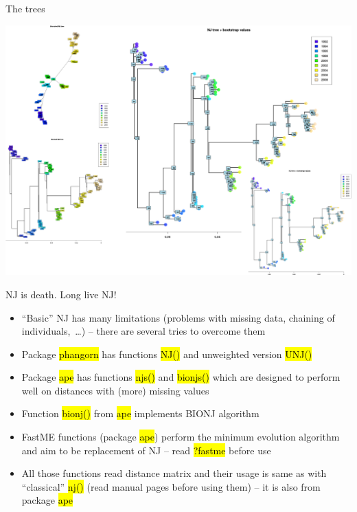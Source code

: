 \documentclass[compress, ucs, xelatex, 11pt, xcolor=svgnames,
  hyperref={
    bookmarks=true,
    unicode=true,
    colorlinks=true,
    pdftitle={Molecular data in R},
    plainpages=false,
    pdfauthor={Vojtech Zeisek},
    pdfsubject={Course about phylogeny and evolution in R},
    pdfcreator={XeLaTeX},
    pdfkeywords={R, evolution, phylogeny, molecular data},
    linkcolor=Tomato,
    anchorcolor=SaddleBrown,
    citecolor=Goldenrod,
    filecolor=DarkMagenta,
    menucolor=Sienna,
    urlcolor=DarkTurquoise,
    pdftex},
  url={hyphens, lowtilde} %
  ]{beamer}
\renewcommand{\texttt}[1]{\hl{\ttfamily #1}}
\begin{document}
\begin{frame}{The trees}
  \begin{center}
    \includegraphics[width=\textwidth-2.5cm]{nj_dna.png}
  \end{center}
\end{frame}

\begin{frame}{NJ is death. Long live NJ!}
  \label{NJ-replacement}
  \begin{itemize}
  \item ``Basic'' NJ has many limitations (problems with missing data, chaining of individuals,~\ldots) -- there are several tries to overcome them
  \item Package \texttt{phangorn} has functions \texttt{NJ()} and unweighted version \texttt{UNJ()}
  \item Package \texttt{ape} has functions \texttt{njs()} and \texttt{bionjs()} which are designed to perform well on distances with (more) missing values
  \item Function \texttt{bionj()} from \texttt{ape} implements BIONJ algorithm
  \item FastME functions (package \texttt{ape}) perform the minimum evolution algorithm and aim to be replacement of NJ -- read \texttt{?fastme} before use
  \item All those functions read distance matrix and their usage is same as with ``classical'' \texttt{nj()} (read manual pages before using them) -- it is also from package \texttt{ape}
  \end{itemize}
\end{frame}
\end{document}
